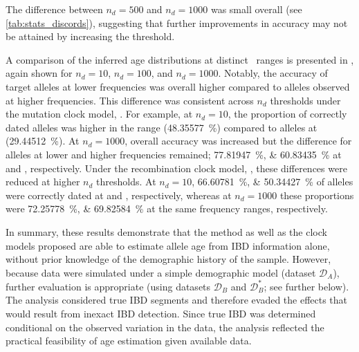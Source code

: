 The difference between ${n_d = \num{500}}$ and ${n_d = \num{1000}}$ was small overall (see \cref{tab:stats_discords}), suggesting that further improvements in accuracy may not be attained by increasing the threshold.

%

%

A comparison of the inferred age distributions at distinct \fk{}~ranges is presented in , again shown for ${n_d = \num{10}}$, ${n_d = \num{100}}$, and ${n_d = \num{1000}}$.
Notably, the accuracy of target alleles at lower frequencies was overall higher compared to alleles observed at higher frequencies.
This difference was consistent across $n_d$ thresholds under the mutation clock model, \ClockM.
For example, at ${n_d = \num{10}}$, the proportion of correctly dated alleles was higher in the \fk{[2,5]} range (\SI{48.35577}{\percent}) compared to alleles at \fk{(5,10]} (\SI{29.44512}{\percent}).
At ${n_d = \num{1000}}$, overall accuracy was increased but the difference for alleles at lower and higher frequencies remained; \ie \SIlist{77.81947;60.83435}{\percent} at \fk{[2,5]} and \fk{(5,10]}, respectively.
Under the recombination clock model, \ClockR, these differences were reduced at higher $n_d$ thresholds.
At ${n_d = \num{10}}$, \SIlist{66.60781;50.34427}{\percent} of alleles were correctly dated at \fk{[2,5]} and \fk{(5,10]}, respectively, whereas at ${n_d = \num{1000}}$ these proportions were \SIlist{72.25778;69.82584}{\percent} at the same frequency ranges, respectively.


In summary, these results demonstrate that the method as well as the clock models proposed are able to estimate allele age from IBD information alone, without prior knowledge of the demographic history of the sample.
However, because data were simulated under a simple demographic model (dataset $\mathcal{D}_A$), further evaluation is appropriate (\eg using datasets $\mathcal{D}_B$ and $\mathcal{D}_B^{\ast}$; see further below).
The analysis considered true IBD segments and therefore evaded the effects that would result from inexact IBD detection.
Since true IBD was determined conditional on the observed variation in the data, the analysis reflected the practical feasibility of age estimation given available data.


